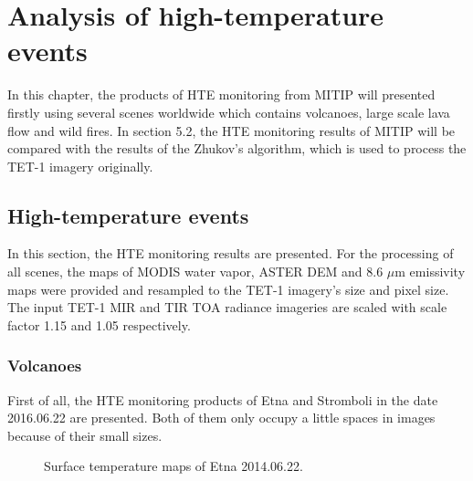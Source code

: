 \chapter{Analysis of high-temperature events}

\label{Chapter5}

In this chapter, the products of HTE monitoring from MITIP will presented firstly using several scenes worldwide which contains volcanoes, large scale lava flow and wild fires. In section 5.2, the HTE monitoring results of MITIP will be compared with the results of the Zhukov's algorithm, which is used to process the TET-1 imagery originally.\\

\section{High-temperature events}
In this section, the HTE monitoring results are presented. For the processing of all scenes, the maps of MODIS water vapor, ASTER DEM and 8.6 $\mu$m emissivity maps were provided and resampled to the TET-1 imagery's size and pixel size. The input TET-1 MIR and TIR TOA radiance imageries are scaled with scale factor 1.15 and 1.05 respectively.\\


\subsection{Volcanoes}
First of all, the HTE monitoring products of Etna and Stromboli in the date 2016.06.22 are presented. Both of them only occupy a little spaces in images because of their small sizes.\\

\begin{figure}[!htbp]
\centering
{}
\hspace{0.1in}
\caption{Surface temperature maps of Etna 2014.06.22.}
\label{fig:Etna_sur_tem}
\end{figure}

